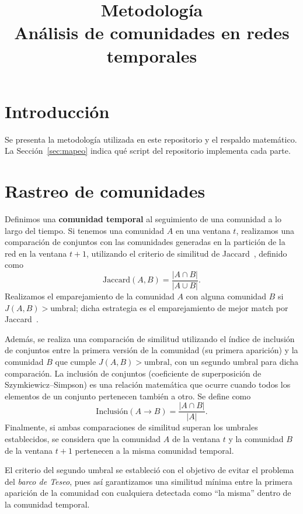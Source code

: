 \documentclass[12pt]{article}
\title{Metodología\\\large Análisis de comunidades en redes temporales}
\author{}
\date{}
\begin{document}
\maketitle

\section{Introducción}
\label{sec:intro}
Se presenta la metodología utilizada en este repositorio y el respaldo matemático. La Sección~\ref{sec:mapeo} indica qué script del repositorio implementa cada parte.

\section{Rastreo de comunidades}
\label{sec:rastreo}

Definimos una \textbf{comunidad temporal} al seguimiento de una comunidad a lo largo del tiempo. Si tenemos una comunidad $A$ en una ventana $t$, realizamos una comparación de conjuntos con las comunidades generadas en la partición de la red en la ventana $t+1$, utilizando el criterio de similitud de Jaccard~\cite{ref:jaccard}, definido como
\[
\text{Jaccard}(A , B) = \frac{|A \cap B|}{|A \cup B|}.
\]
Realizamos el emparejamiento de la comunidad $A$ con alguna comunidad $B$ si $J(A,B) > \text{umbral}$; dicha estrategia es el emparejamiento de mejor match por Jaccard~\cite{ref:bestmatch}.

Además, se realiza una comparación de similitud utilizando el índice de inclusión de conjuntos entre la primera versión de la comunidad (su primera aparición) y la comunidad $B$ que cumple $J(A,B) > \text{umbral}$, con un segundo umbral para dicha comparación. La inclusión de conjuntos (coeficiente de superposición de Szymkiewicz--Simpson) es una relación matemática que ocurre cuando todos los elementos de un conjunto pertenecen también a otro. Se define como
\[
\text{Inclusión}(A \to B) = \frac{|A \cap B|}{|A|}.
\]
Finalmente, si ambas comparaciones de similitud superan los umbrales establecidos, se considera que la comunidad $A$ de la ventana $t$ y la comunidad $B$ de la ventana $t+1$ pertenecen a la misma comunidad temporal.

El criterio del segundo umbral se estableció con el objetivo de evitar el problema del \textit{barco de Teseo}, pues así garantizamos una similitud mínima entre la primera aparición de la comunidad con cualquiera detectada como ``la misma'' dentro de la comunidad temporal.
\end{document}
